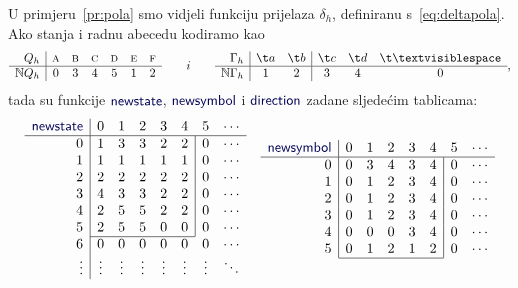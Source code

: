 \begin{primjer}
U primjeru~\ref{pr:pola} smo vidjeli funkciju prijelaza $\delta_h$, definiranu s~\eqref{eq:deltapola}. Ako stanja i radnu abecedu kodiramo kao
\begin{equation}
    \begin{array}{r|cccccc}
         Q_h& \textsc a& \textsc b& \textsc c& \textsc d& \textsc e& \textsc f \\\hline
         \N Q_h& 0 & 3 & 4 & 5 & 1 & 2
    \end{array}\qquad i\qquad
    \begin{array}{r|cc|ccc}
        \Gamma_h& \t a & \t b & \t c & \t d & \bl \\\hline
        \N\Gamma_h & 1 & 2 & 3 & 4 & 0
    \end{array}\text,
\end{equation}
tada su funkcije $\f{newstate}$, $\f{newsymbol}$ i $\f{direction}$ zadane sljedećim tablicama:
\begin{equation}
\begin{array}{r|ccccccc}
\f{newstate}&0&1&2&3&4&5&\cdots\\\hline
0& 1 & 3 & 3 & 2 & 2 & \multicolumn{1}{|c}{0} & \cdots\\
1& 1 & 1 & 1 & 1 & 1 & \multicolumn{1}{|c}{0} & \cdots\\
2& 2 & 2 & 2 & 2 & 2 & \multicolumn{1}{|c}{0} & \cdots\\
3& 4 & 3 & 3 & 2 & 2 & \multicolumn{1}{|c}{0} & \cdots\\
4& 2 & 5 & 5 & 2 & 2 & \multicolumn{1}{|c}{0} & \cdots\\
5& 2 & 5 & 5 & 0 & 0 & \multicolumn{1}{|c}{0} & \cdots\\ \cline{2-6}
6& 0 & 0 & 0 & 0 & 0 & 0 & \cdots\\
\vdots&\vdots&\vdots&\vdots&\vdots&\vdots&\vdots&\ddots
\end{array}\quad
\begin{array}{r|ccccccc}
\f{newsymbol}&0&1&2&3&4&5&\cdots\\\hline
0& 0 & 3 & 4 & 3 & 4 & \multicolumn{1}{|c}{0} & \cdots\\
1& 0 & 1 & 2 & 3 & 4 & \multicolumn{1}{|c}{0} & \cdots\\
2& 0 & 1 & 2 & 3 & 4 & \multicolumn{1}{|c}{0} & \cdots\\
3& 0 & 1 & 2 & 3 & 4 & \multicolumn{1}{|c}{0} & \cdots\\
4& 0 & 0 & 0 & 3 & 4 & \multicolumn{1}{|c}{0} & \cdots\\
5& 0 & 1 & 2 & 1 & 2 & \multicolumn{1}{|c}{0} & \cdots\\ \cline{2-6}

\end{array}
\end{equation}
\end{primjer}
